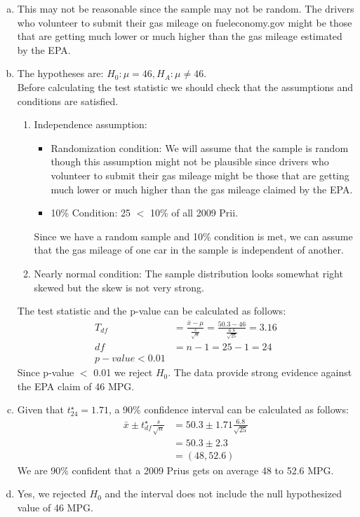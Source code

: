 {
\begin{enumerate}[(a)]
\item This may not be reasonable since the sample may not be random. The drivers who volunteer to submit their gas mileage on fueleconomy.gov might be those that are getting much lower or much higher than the gas mileage estimated by the EPA.
\item The hypotheses are: $H_0: \mu = 46, H_A: \mu \ne 46$. \\
Before calculating the test statistic we should check that the assumptions and conditions are satisfied.
\begin{enumerate}[1.]
\item Independence assumption: 
\begin{itemize}
\item Randomization condition: We will assume that the sample is random though this assumption might not be plausible since drivers who volunteer to submit their gas mileage might be those that are getting much lower or much higher than the gas mileage claimed by the EPA.
\item 10\% Condition: 25 $<$ 10\% of all 2009 Prii.
\end{itemize}
Since we have a random sample and 10\% condition is met, we can assume that the gas mileage of one car in the sample is independent of another.
\item Nearly normal condition: The sample distribution looks somewhat right skewed but the skew is not very strong.
\end{enumerate}
The test statistic and the p-value can be calculated as follows:
\begin{align*}
T_{df} &= \frac{\bar{x} - \mu}{\frac{s}{\sqrt{n}}} = \frac{50.3 - 46}{\frac{6.8}{\sqrt{25}}} = 3.16 \\
df &= n - 1 = 25 - 1 = 24 \\
p-value < 0.01
\end{align*}
Since p-value $<$ 0.01 we reject $H_0$. The data provide strong evidence against the EPA claim of 46 MPG.
\item Given that $t_{24}^\star = 1.71$, a 90\% confidence interval can be calculated as follows:
\begin{align*}
\bar{x} \pm t_{df}^\star \frac{s}{\sqrt{n}} &= 50.3 \pm 1.71 \frac{6.8}{\sqrt{25}} \\
&= 50.3 \pm 2.3 \\
&= (48, 52.6)
\end{align*}
We are 90\% confident that a 2009 Prius gets on average 48 to 52.6 MPG.
\item Yes, we rejected $H_0$ and the interval does not include the null hypothesized value of 46 MPG.
\end{enumerate}
}

